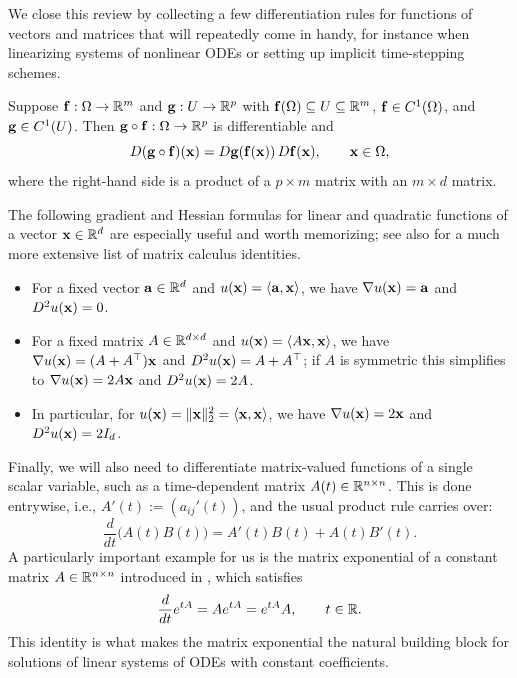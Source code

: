 We close this review by collecting a few differentiation rules for
functions of vectors and matrices that will repeatedly come in handy,
for instance when linearizing systems of nonlinear ODEs or setting up
implicit time-stepping schemes.

\begin{lemma}
    Suppose $\mathbf{f}: \Omega \to \mathbb{R}^m$ and $\mathbf{g}: U \to \mathbb{R}^p$ with $\mathbf{f}(\Omega)
    \subseteq U \subseteq \mathbb{R}^m$, $\mathbf{f} \in C^1(\Omega)$, and $\mathbf{g} \in
    C^1(U)$. Then $\mathbf{g} \circ \mathbf{f}: \Omega \to \mathbb{R}^p$ is differentiable and
    \begin{equation*}
        D(\mathbf{g} \circ \mathbf{f})(\mathbf{x}) = D\mathbf{g}(\mathbf{f}(\mathbf{x})) \, D\mathbf{f}(\mathbf{x}),
        \qquad \mathbf{x} \in \Omega,
    \end{equation*}
    where the right-hand side is a product of a $p \times m$ matrix with
    an $m \times d$ matrix.
\end{lemma}

The following gradient and Hessian formulas for linear and quadratic
functions of a vector $\mathbf{x} \in \mathbb{R}^d$ are especially useful and worth
memorizing; see also \cite{matrixcookbook} for a much more extensive
list of matrix calculus identities.

\begin{itemize}
    \item For a fixed vector $\mathbf{a} \in \mathbb{R}^d$ and $u(\mathbf{x}) = \langle \mathbf{a},
    \mathbf{x} \rangle$, we have $\nabla u(\mathbf{x}) = \mathbf{a}$ and $D^2 u(\mathbf{x}) = 0$.
    \item For a fixed matrix $A \in \mathbb{R}^{d \times d}$ and $u(\mathbf{x}) =
    \langle A \mathbf{x}, \mathbf{x} \rangle$, we have $\nabla u(\mathbf{x}) = (A + A^\top)
    \mathbf{x}$ and $D^2 u(\mathbf{x}) = A + A^\top$; if $A$ is symmetric this
    simplifies to $\nabla u(\mathbf{x}) = 2A\mathbf{x}$ and $D^2 u(\mathbf{x}) = 2A$.
    \item In particular, for $u(\mathbf{x}) = \|\mathbf{x}\|_2^2 = \langle \mathbf{x}, \mathbf{x}
    \rangle$, we have $\nabla u(\mathbf{x}) = 2\mathbf{x}$ and $D^2 u(\mathbf{x}) = 2I_d$.
\end{itemize}

Finally, we will also need to differentiate matrix-valued functions of
a single scalar variable, such as a time-dependent matrix $A(t) \in
\mathbb{R}^{n \times n}$. This is done entrywise, i.e., $A'(t) := (a_{ij}'(t))$,
and the usual product rule carries over:
\begin{equation*}
    \frac{d}{dt} \big( A(t) B(t) \big) = A'(t) B(t) + A(t) B'(t).
\end{equation*}
A particularly important example for us is the matrix exponential of a
constant matrix $A \in \mathbb{R}^{n \times n}$ introduced in
, which satisfies
\begin{equation*}
    \frac{d}{dt} e^{tA} = A e^{tA} = e^{tA} A, \qquad t \in \mathbb{R}.
\end{equation*}
This identity is what makes the matrix exponential the natural building
block for solutions of linear systems of ODEs with constant
coefficients.


